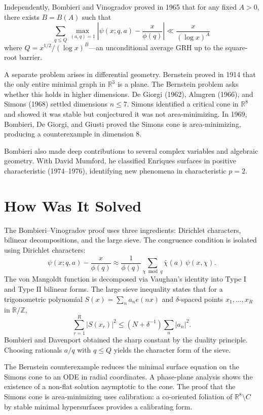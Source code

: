 Independently, Bombieri and Vinogradov proved in 1965 that for any
fixed $A > 0$, there exists $B = B(A)$ such that
\[
\sum_{q \le Q} \max_{(a,q)=1} \left| \psi(x; q, a) - \frac{x}{\phi(q)} \right| \ll \frac{x}{(\log x)^A}
\]
where $Q = x^{1/2} / (\log x)^B$---an unconditional average GRH up to
the square-root barrier.

A separate problem arises in differential geometry. Bernstein proved in
1914 that the only entire minimal graph in $\mathbb{R}^3$ is a plane.
The Bernstein problem asks whether this holds in higher dimensions. De
Giorgi (1962), Almgren (1966), and Simons (1968) settled dimensions
$n \le 7$. Simons identified a critical cone in $\mathbb{R}^8$ and
showed it was stable but conjectured it was not area-minimizing. In
1969, Bombieri, De Giorgi, and Giusti proved the Simons cone is
area-minimizing, producing a counterexample in dimension 8.

Bombieri also made deep contributions to several complex variables and
algebraic geometry. With David Mumford, he classified Enriques surfaces in
positive characteristic (1974--1976), identifying new phenomena in
characteristic $p = 2$.

\section{How Was It Solved}

The Bombieri--Vinogradov proof uses three ingredients: Dirichlet
characters, bilinear decompositions, and the large sieve. The
congruence condition is isolated using Dirichlet characters:
\[
\psi(x; q, a) - \frac{x}{\phi(q)} \approx \frac{1}{\phi(q)} \sum_{\chi \bmod q} \bar{\chi}(a)\, \psi(x, \chi).
\]
The von Mangoldt function is decomposed via Vaughan's identity into
Type I and Type II bilinear forms. The large sieve inequality states
that for a trigonometric polynomial $S(x) = \sum_n a_n e(nx)$ and
$\delta$-spaced points $x_1, \dots, x_R$ in $\mathbb{R}/\mathbb{Z}$,
\[
\sum_{r=1}^R |S(x_r)|^2 \le (N + \delta^{-1}) \sum_n |a_n|^2.
\]
Bombieri and Davenport obtained the sharp constant by the duality
principle. Choosing rationals $a/q$ with $q \le Q$ yields the character
form of the sieve.

The Bernstein counterexample reduces the minimal surface equation on
the Simons cone to an ODE in radial coordinates. A phase-plane analysis
shows the existence of a non-flat solution asymptotic to the cone. The
proof that the Simons cone is area-minimizing uses calibration: a
co-oriented foliation of $\mathbb{R}^8 \setminus C$ by stable minimal
hypersurfaces provides a calibrating form.

